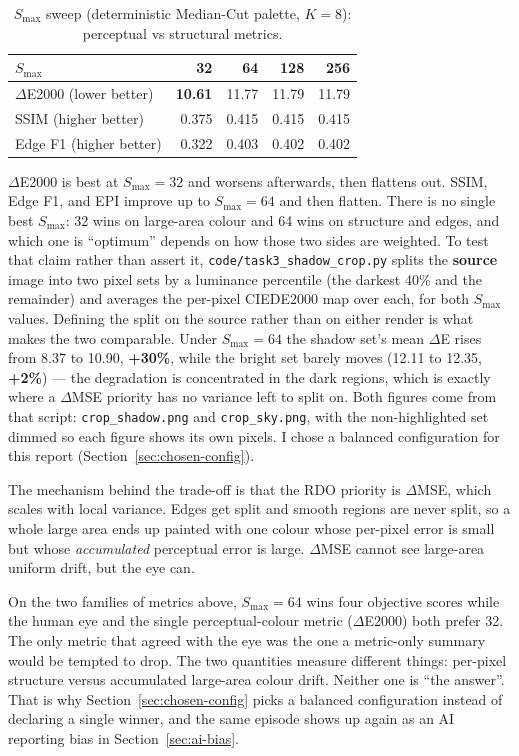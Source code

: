 \documentclass[11pt,a4paper]{article}
\begin{document}
\begin{table}[htbp]
\centering
\begin{tabular}{@{}l r r r r@{}}
\toprule
\textbf{$S_{\max}$} & \textbf{32} & \textbf{64} & \textbf{128} & \textbf{256}\\
\midrule
$\Delta$E2000 (lower better)  & \textbf{10.61} & 11.77 & 11.79 & 11.79 \\
SSIM (higher better)         & 0.375 & 0.415 & 0.415 & 0.415 \\
Edge F1 (higher better)      & 0.322 & 0.403 & 0.402 & 0.402 \\
\bottomrule
\end{tabular}
\caption{$S_{\max}$ sweep (deterministic Median-Cut palette, $K=8$): perceptual
vs structural metrics.}
\label{tab:smax}
\end{table}

$\Delta$E2000 is best at $S_{\max}=32$ and worsens afterwards, then flattens out.
SSIM, Edge F1, and EPI improve up to $S_{\max}=64$ and then flatten. There is no
single best $S_{\max}$: 32 wins on large-area colour and 64 wins on structure and
edges, and which one is ``optimum'' depends on how those two sides are weighted.
To test that claim rather than assert it, \texttt{code/task3\_shadow\_crop.py}
splits the \textbf{source} image into two pixel sets by a luminance percentile
(the darkest 40\% and the remainder) and averages the per-pixel CIEDE2000 map
over each, for both $S_{\max}$ values. Defining the split on the source rather
than on either render is what makes the two comparable. Under $S_{\max}=64$ the
shadow set's mean $\Delta$E rises from 8.37 to 10.90, \textbf{+30\%}, while the
bright set barely moves (12.11 to 12.35, \textbf{+2\%}) --- the degradation is
concentrated in the dark regions, which is exactly where a $\Delta$MSE priority
has no variance left to split on. Both figures come from that script:
\texttt{crop\_shadow.png} and \texttt{crop\_sky.png}, with the non-highlighted
set dimmed so each figure shows its own pixels. I chose a balanced configuration
for this report (Section~\ref{sec:chosen-config}).

The mechanism behind the trade-off is that the RDO priority is $\Delta$MSE, which
scales with local variance. Edges get split and smooth regions are never split,
so a whole large area ends up painted with one colour whose per-pixel error is
small but whose \emph{accumulated} perceptual error is large. $\Delta$MSE cannot
see large-area uniform drift, but the eye can.

On the two families of metrics above, $S_{\max}=64$ wins four objective scores
while the human eye and the single perceptual-colour metric ($\Delta$E2000) both
prefer 32. The only metric that agreed with the eye was the one a metric-only
summary would be tempted to drop. The two quantities measure different things:
per-pixel structure versus accumulated large-area colour drift. Neither one is
``the answer''. That is why Section~\ref{sec:chosen-config} picks a balanced
configuration instead of declaring a single winner, and the same episode shows
up again as an AI reporting bias in Section~\ref{sec:ai-bias}.
\end{document}
